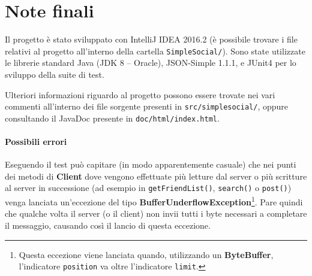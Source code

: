 \documentclass[11pt]{article}
\begin{document}



\section{Note finali}

Il progetto è stato sviluppato con IntelliJ IDEA 2016.2 (è possibile trovare i
file relativi al progetto all'interno della cartella {\tt SimpleSocial/}). Sono
state utilizzate le librerie standard Java (JDK 8 -- Oracle), JSON-Simple 1.1.1,
e JUnit4 per lo sviluppo della suite di test.

Ulteriori informazioni riguardo al progetto possono essere trovate nei vari
commenti all'interno dei file sorgente presenti in {\tt src/simplesocial/},
oppure consultando il JavaDoc presente in {\tt doc/html/index.html}.

\paragraph{Possibili errori} Eseguendo il test può capitare (in modo
apparentemente casuale) che nei punti dei metodi di {\bf Client} dove vengono
effettuate più letture dal server o più scritture al server in successione (ad
esempio in {\tt getFriendList()}, {\tt search()} o {\tt post()}) venga lanciata
un'eccezione del tipo {\bf BufferUnderflowException}\footnote{Questa eccezione
viene lanciata quando, utilizzando un {\bf ByteBuffer}, l'indicatore
{\tt position} va oltre l'indicatore {\tt limit}.}. Pare quindi che qualche
volta il server (o il client) non invii tutti i byte necessari a completare il
messaggio, causando così il lancio di questa eccezione.
\end{document}
